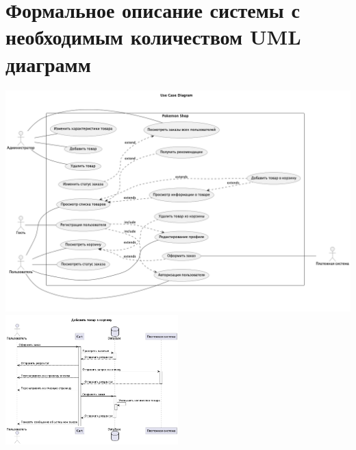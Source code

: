 \documentclass[12pt,onecolumn]{article}
\begin{document}
\section{Формальное описание системы с необходимым количеством UML диаграмм}
\includegraphics[width=\textwidth]{image/usecase.png}
\newpage
\includegraphics[width=0.5\textwidth]{image/sequence.png}
\end{document}
